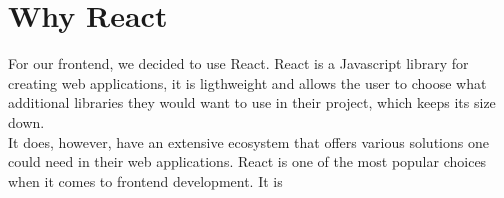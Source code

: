 \section{Why React}
For our frontend, we decided to use React.
React is a Javascript library for creating web applications\cite{ReactJS}, it is ligthweight and allows the user to choose what additional libraries they would want to use in their project, which keeps its size down.
\\
It does, however, have an extensive ecosystem that offers various solutions one could need in their web applications.
React is one of the most popular choices when it comes to frontend development\cite{NPMVueReactAngular}.
It is 
